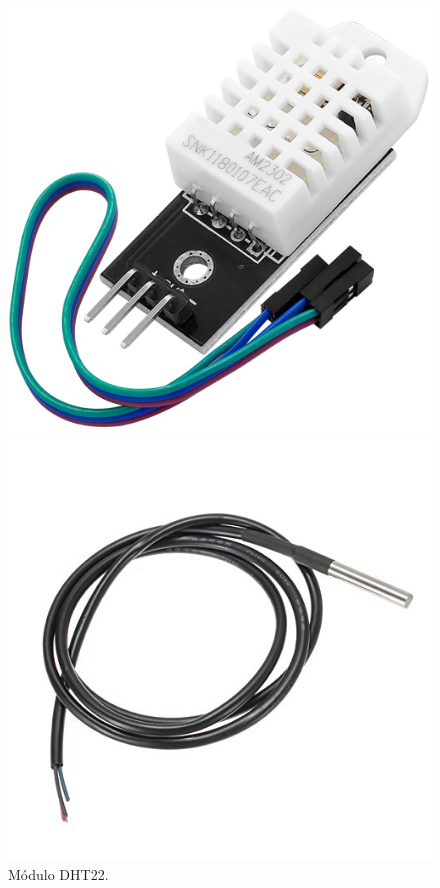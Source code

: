 \documentclass[a4paper, 12pt, oneside]{book}
\begin{document}
\begin{figure}[H]
  \centering
  \begin{minipage}[b]{0.4\textwidth}
    \includegraphics[width=\textwidth]{img/dht22}
    \caption{Módulo DHT22.}
    \label{figura:modulo_dht22}
  \end{minipage}
  \hfill
  \begin{minipage}[b]{0.4\textwidth}
    \includegraphics[width=\textwidth]{img/ds18b20}

\end{minipage}
\end{figure}
\end{document}

